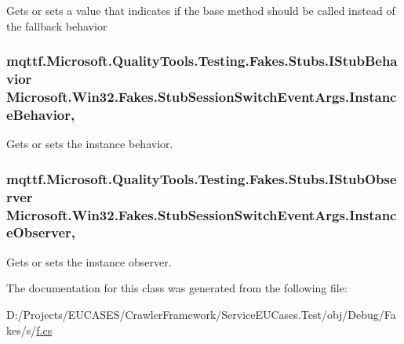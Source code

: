 Gets or sets a value that indicates if the base method should be called instead of the fallback behavior

\hypertarget{class_microsoft_1_1_win32_1_1_fakes_1_1_stub_session_switch_event_args_a93690defc52ca82606dc20e822b3205f}{
\subsubsection[{Instance\-Behavior}]{\setlength{\rightskip}{0pt plus 5cm}mqttf.\-Microsoft.\-Quality\-Tools.\-Testing.\-Fakes.\-Stubs.\-I\-Stub\-Behavior Microsoft.\-Win32.\-Fakes.\-Stub\-Session\-Switch\-Event\-Args.\-Instance\-Behavior\hspace{0.3cm}{\ttfamily [get]}, {\ttfamily [set]}}}\label{class_microsoft_1_1_win32_1_1_fakes_1_1_stub_session_switch_event_args_a93690defc52ca82606dc20e822b3205f}


Gets or sets the instance behavior.

\hypertarget{class_microsoft_1_1_win32_1_1_fakes_1_1_stub_session_switch_event_args_a186e81f4e592ddfbd0f62863e44029c0}{
\subsubsection[{Instance\-Observer}]{\setlength{\rightskip}{0pt plus 5cm}mqttf.\-Microsoft.\-Quality\-Tools.\-Testing.\-Fakes.\-Stubs.\-I\-Stub\-Observer Microsoft.\-Win32.\-Fakes.\-Stub\-Session\-Switch\-Event\-Args.\-Instance\-Observer\hspace{0.3cm}{\ttfamily [get]}, {\ttfamily [set]}}}\label{class_microsoft_1_1_win32_1_1_fakes_1_1_stub_session_switch_event_args_a186e81f4e592ddfbd0f62863e44029c0}


Gets or sets the instance observer.



The documentation for this class was generated from the following file\-:\begin{DoxyCompactItemize}
\item 
D\-:/\-Projects/\-E\-U\-C\-A\-S\-E\-S/\-Crawler\-Framework/\-Service\-E\-U\-Cases.\-Test/obj/\-Debug/\-Fakes/s/\hyperlink{s_2f_8cs}{f.\-cs}\end{DoxyCompactItemize}
